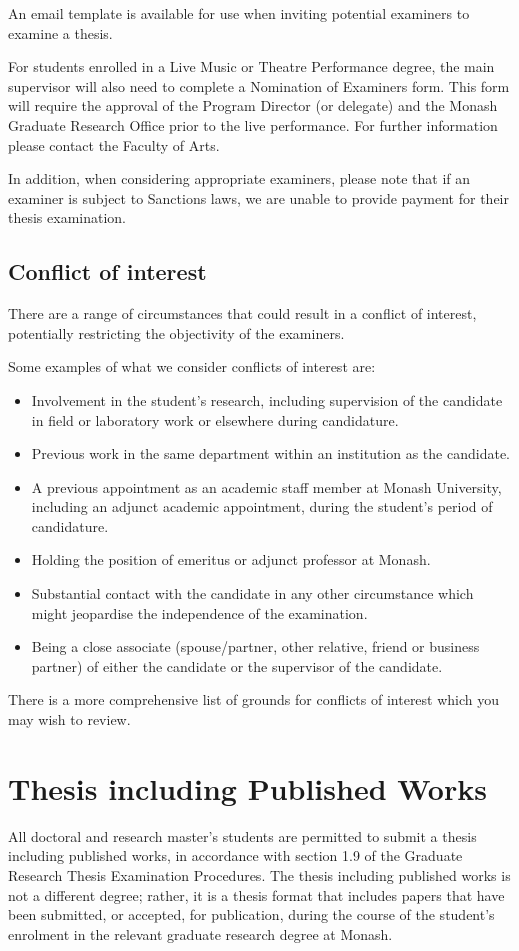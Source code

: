 An email template is available for use when inviting potential examiners to examine a thesis.

For students enrolled in a Live Music or Theatre Performance degree, the main supervisor will also need to complete a Nomination of Examiners form. This form will require the approval of the Program Director (or delegate) and the Monash Graduate Research Office prior to the live performance. For further information please contact the Faculty of Arts.

In addition, when considering appropriate examiners, please note that if an examiner is subject to Sanctions laws, we are unable to provide payment for their thesis examination.

\subsection{Conflict of interest}
There are a range of circumstances that could result in a conflict of interest, potentially restricting the objectivity of the examiners.

Some examples of what we consider conflicts of interest are:
\begin{itemize}
\item Involvement in the student's research, including supervision of the candidate in field or laboratory work or elsewhere during candidature.
\item Previous work in the same department within an institution as the candidate.
\item A previous appointment as an academic staff member at Monash University, including an adjunct academic appointment, during the student’s period of candidature.
\item Holding the position of emeritus or adjunct professor at Monash.
\item Substantial contact with the candidate in any other circumstance which might jeopardise the independence of the examination.
\item Being a close associate (spouse/partner, other relative, friend or business partner) of either the candidate or the supervisor of the candidate.
\end{itemize}
There is a more comprehensive list of grounds for conflicts of interest which you may wish to review.


\section{Thesis including Published Works}
All doctoral and research master's students are permitted to submit a thesis including published works, in accordance with section 1.9 of the Graduate Research Thesis Examination Procedures. The thesis including published works is not a different degree; rather, it is a thesis format that includes papers that have been submitted, or accepted, for publication, during the course of the student's enrolment in the relevant graduate research degree at Monash.

